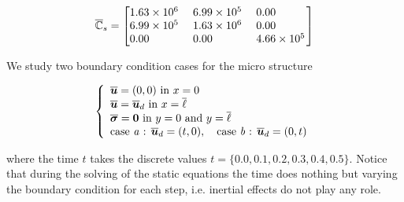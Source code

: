 \documentclass[review]{elsarticle}
\begin{document}
\begin{equation}
  \overline{\mathbb{C}}_s = 
  \begin{bmatrix}
   \begin{tabular}{ @{}*{3}{S[round-mode=places,
                    round-integer-to-decimal,round-precision=2,
                    table-format=1.2e4,table-column-width=16mm,table-number-alignment=center]}@{}
		  }
    1.630150e+06 & 6.986357e+05 & 0.0\\
    6.986357e+05 & 1.630150e+06 & 0.0\\
    0.0          & 0.0          & 4.657572e+05
   \end{tabular}
  \end{bmatrix}
\end{equation}

We study two boundary condition cases for the micro structure

\begin{equation}
\left\{
\begin{array}{ll}
\overline{\bm{u}} = (0,0) \text{ in } x=0\\
\overline{\bm{u}} = \overline{\bm{u}}_d \text{ in } x=\overline{\ell}\\
\overline{\bm{\sigma}} = \bm{0} \text{ in } y=0\text{ and }y=\overline{\ell}\\
\text{case \emph{a} : } \overline{\bm{u}}_d = (t,0) , \quad
\text{case \emph{b} : } \overline{\bm{u}}_d = (0,t)
\end{array}
\right.
\label{micro_eqs}
\end{equation}

\noindent
where the time $t$ takes the discrete values $t = \{ \SI{0.0}, \SI{0.1}, \SI{0.2}, \SI{0.3}, \SI{0.4}, \SI{0.5} \}$.
Notice that during the solving of the static equations the time does nothing but varying the boundary condition
for each step, i.e. inertial effects do not play any role.
\end{document}

